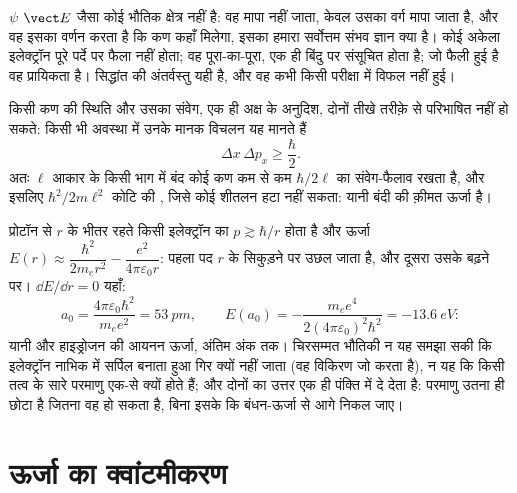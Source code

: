 \begin{remark}[लहराता क्या है]\label{rem:b1:quantum-introduction:whatwaves}
$\psi$ $\vect E$ जैसा कोई भौतिक क्षेत्र नहीं है: वह मापा नहीं जाता, केवल
उसका वर्ग मापा जाता है, और वह इसका वर्णन करता है कि कण कहाँ मिलेगा, इसका
हमारा सर्वोत्तम संभव ज्ञान क्या है। कोई अकेला इलेक्ट्रॉन पूरे पर्दे पर
फैला नहीं होता; वह पूरा-का-पूरा, एक ही बिंदु पर संसूचित होता है; जो फैली
हुई है वह प्रायिकता है। सिद्धांत की अंतर्वस्तु यही है, और वह कभी किसी
परीक्षा में विफल नहीं हुई।
\end{remark}

\begin{theorem}[हाइज़ेनबर्ग का अनिश्चितता सिद्धांत]\label{thm:b1:quantum-introduction:heisenberg}
किसी कण की स्थिति और उसका संवेग, एक ही अक्ष के अनुदिश, दोनों तीखे तरीक़े से
परिभाषित नहीं हो सकते: किसी भी अवस्था में उनके मानक विचलन यह मानते हैं
\[
\Delta x\,\Delta p_x \geq \frac{\hbar}{2} .
\]
अतः $\ell$ आकार के किसी भाग में बंद कोई कण कम से कम $\hbar/2\ell$ का
संवेग-फैलाव रखता है, और इसलिए $\hbar^2/2m\ell^2$ कोटि की , जिसे
कोई शीतलन हटा नहीं सकता: यानी बंदी की क़ीमत ऊर्जा है।
\end{theorem}
\admitted

\begin{example}[हाइड्रोजन परमाणु का आकार]\label{ex:b1:quantum-introduction:hsize}
प्रोटॉन से $r$ के भीतर रहते किसी इलेक्ट्रॉन का $p \gtrsim \hbar/r$ होता है
और ऊर्जा
$E(r) \approx \dfrac{\hbar^2}{2m_er^2} - \dfrac{e^2}{4\pi\varepsilon_0r}$: पहला
पद $r$ के सिकुड़ने पर उछल जाता है, और दूसरा उसके बढ़ने पर। $\dd E/\dd r = 0$ यहाँ:
\[
a_0 = \frac{4\pi\varepsilon_0\hbar^2}{m_ee^2} = \qty{53}{pm} , \qquad
E(a_0) = -\frac{m_ee^4}{2(4\pi\varepsilon_0)^2\hbar^2} = \qty{-13.6}{eV} :
\]
यानी \emph{} और हाइड्रोजन की आयनन ऊर्जा, अंतिम अंक तक।
चिरसम्मत भौतिकी न यह समझा सकी कि इलेक्ट्रॉन नाभिक में सर्पिल बनाता हुआ गिर
क्यों नहीं जाता (वह विकिरण जो करता है), न यह कि किसी तत्व के सारे परमाणु
एक-से क्यों होते हैं; और  दोनों का उत्तर एक ही पंक्ति
में दे देता है: परमाणु उतना ही छोटा है जितना वह हो सकता है, बिना इसके कि
 बंधन-ऊर्जा से आगे निकल जाए।
\end{example}

\section{ऊर्जा का क्वांटमीकरण}

